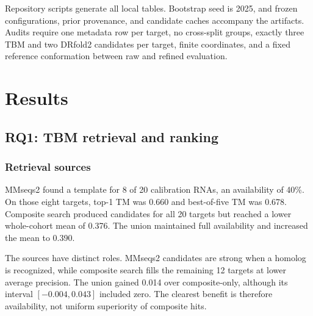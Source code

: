 \documentclass[12pt,a4paper,oneside]{report}
\begin{document}
Repository scripts generate all local tables. Bootstrap seed is 2025, and frozen
configurations, prior provenance, and candidate caches accompany the artifacts. Audits
require one metadata row per target, no cross-split groups, exactly three TBM and two
DRfold2 candidates per target, finite coordinates, and a fixed reference conformation
between raw and refined evaluation.

\chapter{Results}
\label{chap:results_en}

\section{RQ1: TBM retrieval and ranking}

\subsection{Retrieval sources}

MMseqs2 found a template for 8 of 20 calibration RNAs, an availability of 40\%. On those
eight targets, top-1 TM was 0.660 and best-of-five TM was 0.678. Composite search
produced candidates for all 20 targets but reached a lower whole-cohort mean of 0.376.
The union maintained full availability and increased the mean to 0.390.

\begin{table}[H]
\centering
\caption{Retrieval-source results on 20 calibration RNAs. MMseqs2 quality is conditional
on the eight targets with a hit.}
\label{tab:search_source_en}
\end{table}

The sources have distinct roles. MMseqs2 candidates are strong when a homolog is
recognized, while composite search fills the remaining 12 targets at lower average
precision. The union gained 0.014 over composite-only, although its interval
$[-0.004,0.043]$ included zero. The clearest benefit is therefore availability,
not uniform superiority of composite hits.
\end{document}
